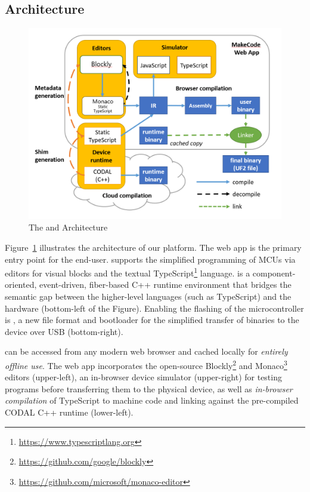 \subsection{Architecture}

\begin{figure}[t]
    \includegraphics[width=\columnwidth]{images/arch-diagram.png}
    \setlength{\belowcaptionskip}{-10pt}
    \caption{\label{fig:makecode}The \MC and \CO Architecture}
\end{figure}

Figure~\ref{fig:makecode} illustrates the architecture of our platform.
The \MC web app is the primary entry point for the end-user. \MC supports
the simplified programming of MCUs via editors for visual blocks and the textual TypeScript\footnote{\url{https://www.typescriptlang.org}} language. \CO is a component-oriented, event-driven, fiber-based C++ runtime environment that bridges the semantic gap between the higher-level languages (such
as TypeScript) and the hardware (bottom-left of the Figure).
Enabling the flashing of the microcontroller is \UFN,
a new file format and bootloader for the simplified transfer of binaries to the device over USB (bottom-right).

\MC can be accessed from any modern web browser and cached locally for \emph{entirely offline use}. The \MC web app incorporates the open-source Blockly\footnote{\url{https://github.com/google/blockly}} and Monaco\footnote{\url{https://github.com/microsoft/monaco-editor}} editors (upper-left), an in-browser device simulator (upper-right) for testing programs before transferring them to the physical device, as well as \emph{in-browser compilation} of TypeScript to machine code and linking against the pre-compiled
CODAL C++ runtime (lower-left).

